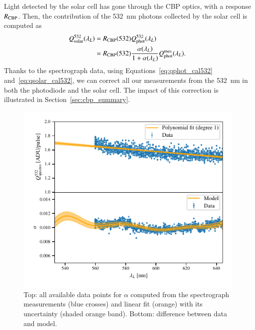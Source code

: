 Light detected by the solar cell has gone through the CBP optics, with a response $R_{\mathrm{CBP}}$.
Then, the contribution of the \SI{532}{\nano\meter} photons collected by the solar cell is computed as
\begin{equation}
\begin{aligned}
    Q_{\mathrm{solar}}^{532}(\lambda_L) & = R_{\mathrm{CBP}}(532)  Q_{\mathrm{phot}}^{532}(\lambda_L) \\ 
    & = R_{\mathrm{CBP}}(532) \frac{ \alpha(\lambda_L) }{1+ \alpha(\lambda_L)} Q_{\mathrm{phot}}^{\mathrm{mes}}(\lambda_L).
    \label{eq:qsolar_cal532}
\end{aligned}
\end{equation}
Thanks to the spectrograph data, using Equations~\ref{eq:qphot_cal532} and~\ref{eq:qsolar_cal532}, we can correct all our measurements from the \SI{532}{\nano\meter} in both the photodiode and the solar cell. The impact of this correction is illustrated in Section~\ref{sec:cbp_summary}.


\begin{figure}%
    \centering
    \includegraphics[width=\columnwidth]{fig/alpha_532_qswMAX.pdf}
    \caption{Top: all available data points for $\alpha$ computed from the spectrograph measurements (blue crosses) and linear fit (orange) with its uncertainty (shaded orange band). Bottom: difference between data and model.}
    \label{fig:alpha_532}
\end{figure}

